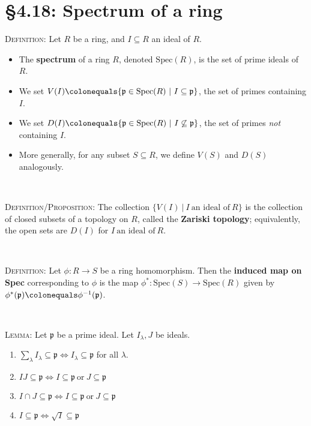 \documentclass[12pt]{amsart}
\newcommand{\p}{\mathfrak{p}}
\newcommand{\Spec}{\mathrm{Spec}}
\renewcommand{\1}{\mathbbm{1}}
\newcommand{\showsol}[1]{\def\displaysol{#1}}
\newcommand\ceq{\colonequals}
\begin{document}
\showsol{0}
	
	\thispagestyle{empty}
	
	\section*{\S4.18: Spectrum of a ring}	

\begin{framed}
\noindent \textsc{Definition:} Let $R$ be a ring, and $I\subseteq R$ an ideal of $R$.
\begin{itemize}
\item The \textbf{spectrum} of a ring $R$, denoted $\mathrm{Spec}(R)$, is the set of prime ideals of $R$. 
\item We set $V(I) \ceq \{ \p \in \Spec(R) \ | \ I \subseteq \p\}$, the set of primes containing $I$.
\item We set $D(I) \ceq \{ \p \in \Spec(R) \ | \ I \not\subseteq \p\}$, the set of primes \emph{not} containing $I$.
\item More generally, for any subset $S\subseteq R$, we define $V(S)$ and $D(S)$ analogously.
\end{itemize}


\

\noindent \textsc{Definition/Proposition:} The collection $\{ V(I) \ | \ I \ \text{an ideal of} \ R \}$ is the collection of closed subsets of a topology on $R$, called the \textbf{Zariski topology}; equivalently, the open sets are $D(I)$ for $I \ \text{an ideal of} \ R$.

\

\noindent \textsc{Definition:} Let $\phi: R\to S$ be a ring homomorphism. Then the \textbf{induced map on Spec} corresponding to $\phi$ is the map $\phi^*: \Spec(S) \to \Spec(R)$ given by $\phi^*(\p) \ceq \phi^{-1}(\p)$.

\

\noindent \textsc{Lemma:} Let $\p$ be a prime ideal. Let $I_\lambda,J$ be ideals.
\begin{enumerate}
\item $\sum_{\lambda} I_\lambda \subseteq \p \Longleftrightarrow I_\lambda \subseteq \p$ for all $\lambda$.
\item $IJ  \subseteq \p \Longleftrightarrow I\subseteq \p \ \text{or} \ J \subseteq \p$
\item $I \cap J \subseteq \p \Longleftrightarrow I\subseteq \p \ \text{or} \ J \subseteq \p$
\item $I \subseteq \p \Longleftrightarrow \sqrt{I} \subseteq \p$
\end{enumerate}

\end{framed}
 
\end{document}
